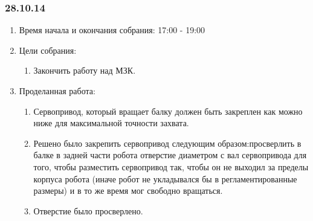 
\subsubsection{28.10.14}

\begin{enumerate}
	\item Время начала и окончания собрания:
	17:00 - 19:00
	\item Цели собрания:
	\begin{enumerate}
	  \item Закончить работу над МЗК.
	  
    \end{enumerate}
    
	\item Проделанная работа:
	\begin{enumerate}
	  \item Сервопривод, который вращает балку должен быть закреплен как можно ниже для максимальной точности захвата.
      
      \item Решено было закрепить сервопривод следующим образом:просверлить в балке в задней части робота отверстие диаметром с вал сервопривода для того, чтобы разместить сервопривод так, чтобы он не выходил за пределы корпуса робота (иначе робот не укладывался бы в регламентированные размеры) и в то же время мог свободно вращаться.
      
      \item Отверстие было просверлено.
      

\end{enumerate}
\end{enumerate}
